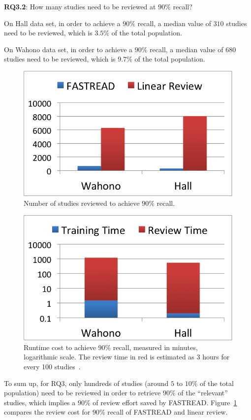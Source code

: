 \documentclass[final,twocolumn,5p]{elsarticle}
\theoremstyle{break}
\begin{document}
\textbf{RQ3.2}: How many studies need to be reviewed at $90\%$ recall?

On Hall data set, in order to achieve a $90\%$ recall, a median value of $310$ studies need to be reviewed, which is $3.5\%$ of the total population.

On Wahono data set, in order to achieve a $90\%$ recall, a median value of $680$ studies need to be reviewed, which is $9.7\%$ of the total population.


\begin{figure}[t]
    \centering
    \includegraphics[width=.7\linewidth]{Reviewcost.png}    
    \caption{Number of studies reviewed to achieve $90\%$ recall.}
    \label{fig:reviewcost}
\end{figure}


\begin{figure}[t]
    \centering
    \includegraphics[width=.7\linewidth]{runtime.png}    
    \caption{Runtime cost to achieve $90\%$ recall, measured in minutes, logarithmic scale. The review time in red is estimated as 3 hours for every 100 studies~\cite{malheiros2007visual}.}
    \label{fig:runtime}
\end{figure}

To sum up, for RQ3, only hundreds of studies (around $5$ to $10\%$ of the total population) need to be reviewed in order to retrieve $90\%$ of the ``relevant'' studies, which implies a $90\%$ of review effort saved by FASTREAD. Figure~\ref{fig:reviewcost} compares the review cost for $90\%$ recall of FASTREAD and linear review.
\end{document}
